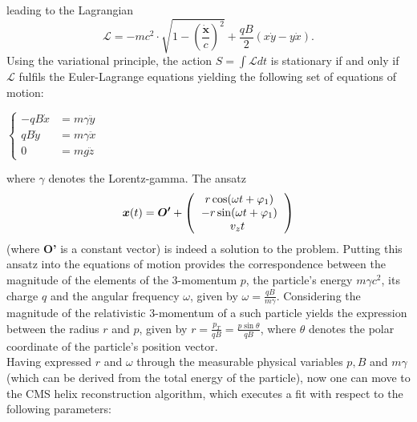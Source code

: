 leading to the Lagrangian
\begin{equation}
	\mathcal{L} = -mc^2\cdot\sqrt{1-\left(\frac{\dot{\boldsymbol{x}}}{c}\right)^2}+\frac{qB}{2}( x\dot{y} - y\dot{x}).
\end{equation}
Using the variational principle, the action $S =\int\mathcal{L}dt$ is stationary if and only if $\mathcal{L}$ fulfils the Euler-Lagrange equations yielding the following set of equations of motion:
\begin{center}
	$\left\lbrace
	\begin{aligned}
		-qB\dot{x}&=m\gamma\ddot{y}\\
		qB\dot{y}&=m\gamma\ddot{x}\\
		0&=mg\ddot{z}
	\end{aligned}
	\right.$
\end{center}
where $\gamma$ denotes the Lorentz-gamma. The ansatz
\begin{equation}
	\boldsymbol{x}(t) = \boldsymbol{O'} +  \left(\begin{tabular}{c}
	$r\cos(\omega t + \varphi_1) $\\ 
	$-r\sin(\omega t + \varphi_1) $\\ 
	$v_z t $
	\label{eq:ansatz}
	\end{tabular} \right)
\end{equation}
(where \textbf{O'} is a constant vector) is indeed a solution to the problem. Putting this ansatz into the equations of motion provides the correspondence between the magnitude of the elements of the 3-momentum $p$, the particle's energy $m\gamma c^2$, its charge $q$ and the angular frequency $\omega$, given by $\omega = \frac{qB}{m\gamma}$. Considering the magnitude of the relativistic 3-momentum of a such particle yields the expression between the radius $r$ and $p$, given by $r=\frac{p_T}{qB}=\frac{p\sin\theta}{qB}$, where $\theta$ denotes the polar coordinate of the particle's position vector.\\
Having expressed $r$ and $\omega$ through the measurable physical variables $p, B$ and $m\gamma$ (which can be derived from the total energy of the particle), now one can move to the CMS helix reconstruction algorithm, which executes a fit with respect to the following parameters:

